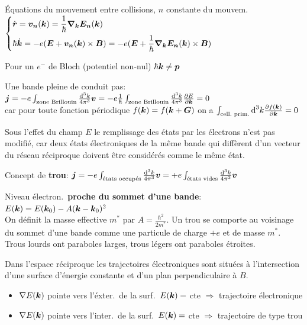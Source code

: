 \begin{squishlist}
    \item Équations du mouvement entre collisions, $n$ constante du mouvem.
    $ \left\{ \begin{aligned} 
        & \dot{\vec{r}} = \vec{v_n}(\vk) = \frac{1}{\hbar} \vec{\nabla_\vec{k}E_n}(\vk) \\
        & \hbar \dot{\vec{k}} =  -e (\vec{E} + \vec{v_n}(\vk) \times \vec{B}) =  -e (\vec{E} + \frac{1}{\hbar} \vec{\nabla_\vec{k}E_n}(\vk) \times \vec{B})
    \end{aligned} \right. $
    
    \item Pour un $e^-$ de Bloch (potentiel non-nul) $\hbar \vk \neq \vec{p}$
    \item Une bande pleine de conduit pas: \\
    $\vec{j} = -e \int_{\text{zone Brillouin}} \frac{\ud^3 k}{4 \pi^3}\vec{v} = -e \frac{1}{\hbar} \int_{\text{zone Brillouin}} \frac{\ud^3 k}{4 \pi^3} \D{\vec{k}}{E} = 0$ \\
    car pour toute fonction périodique $f(\vk) = f(\vk + \vG)$ on a $\int_{\text{cell.\ prim.}}\ud^3 k \D{\vk}{f(\vk)} = 0$
    \item Sous l’eﬀet du champ $E$ le remplissage
    des états par les électrons n’est pas modifié, car deux états électroniques de la même bande qui diffèrent d’un vecteur du réseau réciproque doivent être considérés comme le même état.
    \item Concept de \textbf{trou}: $\vec{j} = -e \int_{\text{états occupés}} \frac{\ud^3 k}{4 \pi^3}\vec{v} = +e \int_{\text{états vides}} \frac{\ud^3 k}{4 \pi^3}\vec{v}$
    \item Niveau électron.\ \textbf{proche du sommet d'une bande}: $E(\vk) = E(\vk_0) - A(\vk - \vk_0)^2$ \\
    On définit la masse effective $m^*$ par $A = \frac{\hbar^2}{2m^*}$.
    Un trou se comporte au voisinage du sommet d’une bande
    comme une particule de charge $+e$ et de masse $m^*$. Trous lourds ont paraboles larges, trous légers ont paraboles étroites.

    \item Dans l’espace réciproque les trajectoires électroniques sont situées à l’intersection d’une surface d’énergie constante et d’un plan perpendiculaire à $B$.
    \begin{itemize}
        \item $\nabla E(\vk)$ pointe vers l'éxter.\ de la surf.\ $E(\vk) = $ cte $\Rightarrow$ trajectoire électronique
        \item $\nabla E(\vk)$ pointe vers l'inter.\ de la surf.\ $E(\vk) = $ cte $\Rightarrow$ trajectoire de type trou
    \end{itemize}
\end{squishlist}

